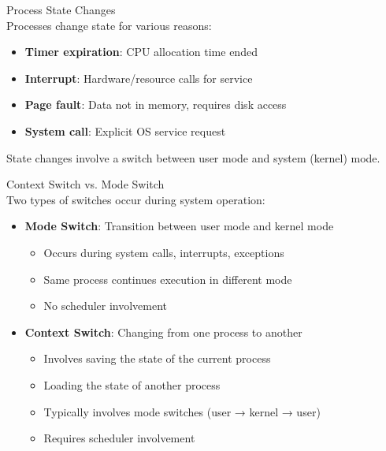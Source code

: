 \begin{definition}{Process State Changes}\\
    Processes change state for various reasons:
    \begin{itemize}
        \item \textbf{Timer expiration}: CPU allocation time ended
        \item \textbf{Interrupt}: Hardware/resource calls for service
        \item \textbf{Page fault}: Data not in memory, requires disk access
        \item \textbf{System call}: Explicit OS service request
    \end{itemize}
    
    State changes involve a switch between user mode and system (kernel) mode.
\end{definition}

\begin{concept}{Context Switch vs. Mode Switch}\\
    Two types of switches occur during system operation:
    \begin{itemize}
        \item \textbf{Mode Switch}: Transition between user mode and kernel mode
            \begin{itemize}
                \item Occurs during system calls, interrupts, exceptions
                \item Same process continues execution in different mode
                \item No scheduler involvement
            \end{itemize}
        \item \textbf{Context Switch}: Changing from one process to another
            \begin{itemize}
                \item Involves saving the state of the current process
                \item Loading the state of another process
                \item Typically involves mode switches (user → kernel → user)
                \item Requires scheduler involvement
            \end{itemize}
    \end{itemize}
\end{concept}

\multend

